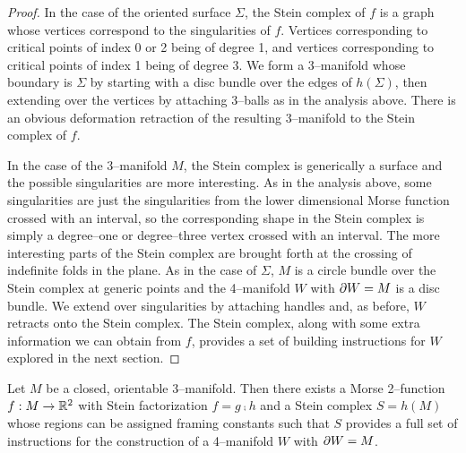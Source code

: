 \begin{proof}
In the case of the oriented surface $\Sigma$, the Stein complex of $f$ is a graph whose vertices correspond to the singularities of $f$.
Vertices corresponding to critical points of index 0 or 2 being of degree 1, and vertices corresponding to critical points of index 1 being of degree 3.
We form a 3--manifold whose boundary is $\Sigma$ by starting with a disc bundle over the edges of $h(\Sigma)$, then extending over the vertices by attaching 3--balls as in the analysis above.
There is an obvious deformation retraction of the resulting 3--manifold to the Stein complex of $f$.

In the case of the 3--manifold $M$, the Stein complex is generically a surface and the possible singularities are more interesting.
As in the analysis above, some singularities are just the singularities from the lower dimensional Morse function crossed with an interval, so the corresponding shape in the Stein complex is simply a degree--one or degree--three vertex crossed with an interval.
The more interesting parts of the Stein complex are brought forth at the crossing of indefinite folds in the plane.
As in the case of $\Sigma$, $M$ is a circle bundle over the Stein complex at generic points and the 4--manifold $W$ with $\partial W = M$ is a disc bundle.
We extend over singularities by attaching handles and, as before, $W$ retracts onto the Stein complex.
The Stein complex, along with some extra information we can obtain from $f$, provides a set of building instructions for $W$ explored in the next section.
\end{proof}

\begin{cor}
	\label{cor:3stein4}
	Let $M$ be a closed, orientable 3--manifold.
	Then there exists a Morse 2--function $f:M\to\mathbb{R}^2$ with Stein factorization $f=g\comp h$ and a Stein complex $S=h(M)$ whose regions can be assigned framing constants such that $S$ provides a full set of instructions for the construction of a 4--manifold $W$ with $\partial W=M$.
\end{cor}
